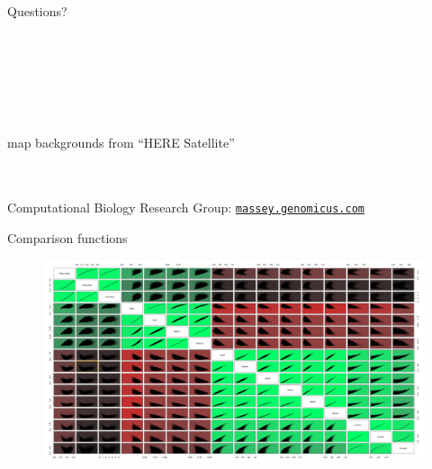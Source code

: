 \documentclass[10pt, aspectratio=43]{beamer}
\begin{document}
\begin{frame}[plain]

    \color{masseyBlue}
    \begin{Huge}
      Questions?
    \end{Huge}
    \\~\\~\\~\\~\\
    \begin{small}
      \color{gray}
      map backgrounds from “HERE Satellite”
    \end{small}
    \\~\\
    Computational Biology Research Group: \href{http://massey.genomicus.com}{\texttt{massey.genomicus.com}}

\end{frame}


\begin{frame}{}{Comparison functions}
\begin{figure}
  \hspace*{-1cm}
  \includegraphics[width=1.17\textwidth]{../data/comparisonFunctions.png}
\end{figure}
\end{frame}
\end{document}
